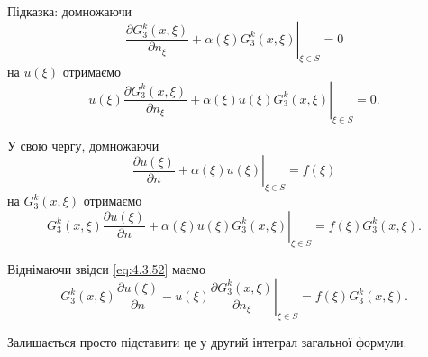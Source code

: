 \begin{remark}
	Підказка: домножаючи 
	\begin{equation}
		\left. \frac{\partial G_3^k(x, \xi)}{\partial n_\xi} + \alpha(\xi) G_3^k(x, \xi) \right|_{\xi \in S} = 0
	\end{equation}
	на $u(\xi)$ отримаємо
	\begin{equation}
		\label{eq:4.3.52}
		\left. u(\xi) \frac{\partial G_3^k(x, \xi)}{\partial n_\xi} + \alpha(\xi) u(\xi) G_3^k(x, \xi) \right|_{\xi \in S} = 0.
	\end{equation}

	У свою чергу, домножаючи
	\begin{equation}
		\left. \frac{\partial u(\xi)}{\partial n} + \alpha(\xi) u(\xi) \right|_{\xi \in S} = f(\xi)
	\end{equation}
	на $G_3^k(x, \xi)$ отримаємо
	\begin{equation}
		\left. G_3^k(x, \xi) \frac{\partial u(\xi)}{\partial n} + \alpha(\xi) u(\xi) G_3^k(x, \xi) \right|_{\xi \in S} = f(\xi) G_3^k(x, \xi).
	\end{equation}

	Віднімаючи звідси \eqref{eq:4.3.52} маємо
	\begin{equation}
		\left. G_3^k(x, \xi) \frac{\partial u(\xi)}{\partial n} - u(\xi) \frac{\partial G_3^k(x, \xi)}{\partial n_\xi} \right|_{\xi \in S} = f(\xi) G_3^k(x, \xi).
	\end{equation}

	Залишається просто підставити це у другий інтеграл загальної формули.
\end{remark}

